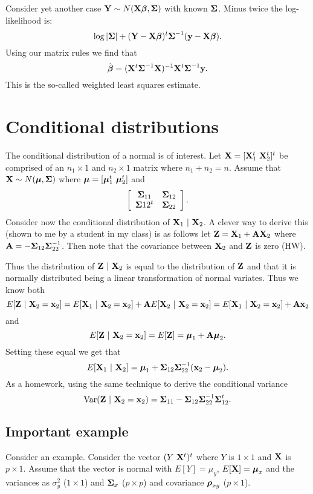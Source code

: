 Consider yet another case $\mathbf{Y} \sim N(\mathbf{X}\boldsymbol{\beta}, \boldsymbol{\Sigma})$ with known $\boldsymbol{\Sigma}$.
Minus twice the log-likelihood is:
$$
\log |\boldsymbol{\Sigma}| + (\mathbf{Y} - \mathbf{X} \boldsymbol{\beta})^t \boldsymbol{\Sigma}^{-1} (\mathbf{y} - \mathbf{X} \boldsymbol{\beta}).
$$
Using our matrix rules we find that
$$
\hat {\boldsymbol{\beta}} = (\mathbf{X}^t \boldsymbol{\Sigma}^{-1} \mathbf{X})^{-1} \mathbf{X}^t \boldsymbol{\Sigma}^{-1}\mathbf{y}. 
$$
This is the so-called weighted least squares estimate. 


\section{Conditional distributions}
The conditional distribution of a normal is of interest.
Let $\mathbf{X} = [\mathbf{X}_1^t ~ \mathbf{X}_2^t]^t$ be comprised of an $n_1 \times 1$
and $n_2 \times 1$ matrix where $n_1 + n_2  = n$. Assume that
$\mathbf{X} \sim N(\boldsymbol{\mu}, \boldsymbol{\Sigma})$ where $\boldsymbol{\mu} = [\boldsymbol{\mu}_1^t ~ \boldsymbol{\mu}_2^t]$
and 
$$
\left[
\begin{array}{cc}
\boldsymbol{\Sigma}_{11} & \boldsymbol{\Sigma}_{12} \\
\boldsymbol{\Sigma}{12}^t & \boldsymbol{\Sigma}_{22}
\end{array}
\right].
$$
Consider now the conditional distribution of $\mathbf{X}_1 ~|~ \mathbf{X}_2$. 
A clever way to derive this (shown to me by a student in my class)
is as follows let $\mathbf{Z} = \mathbf{X}_1 + \mathbf{A} \mathbf{X}_2$
where $\mathbf{A} = - \boldsymbol{\Sigma}_{12}\boldsymbol{\Sigma}_{22}^{-1}$. Then note that
the covariance between $\mathbf{X}_2$ and $\mathbf{Z}$ is zero (HW).

Thus the distribution of $\mathbf{Z} ~|~ \mathbf{X}_2$ is equal
to the distribution of $\mathbf{Z}$ and that it is normally distributed
being a linear transformation of normal variates. Thus we know both
$$
E[\mathbf{Z} ~|~ \mathbf{X}_2 = \mathbf{x}_2] = E[\mathbf{X}_1 ~|~ \mathbf{X}_2 = \mathbf{x}_2] + \mathbf{A} E[\mathbf{X}_2 ~|~ \mathbf{X}_2 = \mathbf{x}_2]
= E[\mathbf{X}_1 ~|~ \mathbf{X}_2 = \mathbf{x}_2] + \mathbf{A} \mathbf{x}_2
$$
and
$$
E[\mathbf{Z} ~|~ \mathbf{X}_2 = \mathbf{x}_2] = E[\mathbf{Z}] = \boldsymbol{\mu}_1 + \mathbf{A} \boldsymbol{\mu}_2.
$$
Setting these equal we get that
$$
E[\mathbf{X}_1 ~|~ \mathbf{X}_2] = \boldsymbol{\mu}_1 + \boldsymbol{\Sigma}_{12}\boldsymbol{\Sigma}_{22}^{-1} (\mathbf{x}_2 - \boldsymbol{\mu}_2).
$$
As a homework, using the same technique to derive the conditional variance
$$
\mbox{Var}(\mathbf{Z} ~|~ \mathbf{X}_2 = \mathbf{x}_2) = \boldsymbol{\Sigma}_{11} - \boldsymbol{\Sigma}_{12} \boldsymbol{\Sigma}_{22}^{-1} \boldsymbol{\Sigma}_{12}^t.
$$

\subsection{Important example}
Consider an example. Consider the vector 
$(Y ~ \mathbf{X}^t)^t$ where $Y$ is $1\times 1$ and $\mathbf{X}$ is $p\times 1$. Assume that 
the vector is normal with $E[Y] = \mu_y$, $E[\mathbf{X}] = \boldsymbol{\mu}_x$ and the variances
as $\sigma^2_y$ ($1\times 1$) and $\boldsymbol{\Sigma}_x$ ($p\times p$) 
and covariance $\boldsymbol{\rho}_{xy}$ ($p \times 1$).

